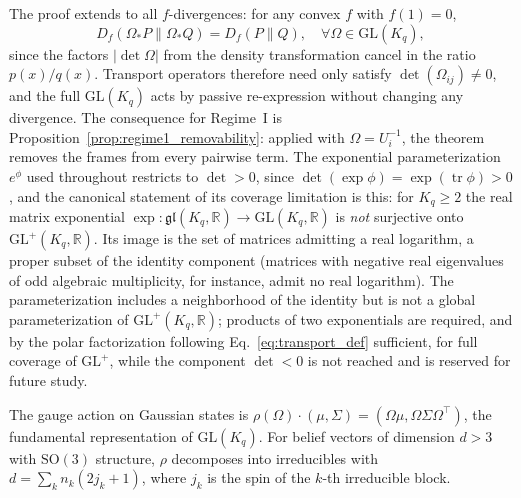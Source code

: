 \documentclass[11pt]{article}
\begin{document}
The proof extends to all $f$-divergences: for any convex $f$ with $f(1) = 0$,
\begin{equation}
D_f(\Omega_* P \| \Omega_* Q) = D_f(P \| Q), \quad \forall \Omega \in \mathrm{GL}(K_q),
\end{equation}
since the factors $|\det\Omega|$ from the density transformation cancel in the ratio $p(x)/q(x)$. Transport operators therefore need only satisfy $\det(\Omega_{ij}) \neq 0$, and the full $\mathrm{GL}(K_q)$ acts by passive re-expression without changing any divergence. The consequence for Regime~I is Proposition~\ref{prop:regime1_removability}: applied with $\Omega = U_i^{-1}$, the theorem removes the frames from every pairwise term. The exponential parameterization $e^{\phi}$ used throughout restricts to $\det > 0$, since $\det(\exp\phi) = \exp(\operatorname{tr}\phi) > 0$, and the canonical statement of its coverage limitation is this: for $K_q \ge 2$ the real matrix exponential $\exp: \mathfrak{gl}(K_q, \mathbb{R}) \to \mathrm{GL}(K_q, \mathbb{R})$ is \emph{not} surjective onto $\mathrm{GL}^+(K_q, \mathbb{R})$. Its image is the set of matrices admitting a real logarithm, a proper subset of the identity component (matrices with negative real eigenvalues of odd algebraic multiplicity, for instance, admit no real logarithm). The parameterization includes a neighborhood of the identity but is not a global parameterization of $\mathrm{GL}^+(K_q, \mathbb{R})$; products of two exponentials are required, and by the polar factorization following Eq.~\eqref{eq:transport_def} sufficient, for full coverage of $\mathrm{GL}^+$, while the component $\det < 0$ is not reached and is reserved for future study.

The gauge action on Gaussian states is $\rho(\Omega)\cdot(\mu,\Sigma)=(\Omega\mu,\Omega\Sigma\Omega^\top)$, the fundamental representation of $\mathrm{GL}(K_q)$. For belief vectors of dimension $d>3$ with $\mathrm{SO}(3)$ structure, $\rho$ decomposes into irreducibles with $d=\sum_k n_k(2j_k+1)$, where $j_k$ is the spin of the $k$-th irreducible block.
\end{document}
